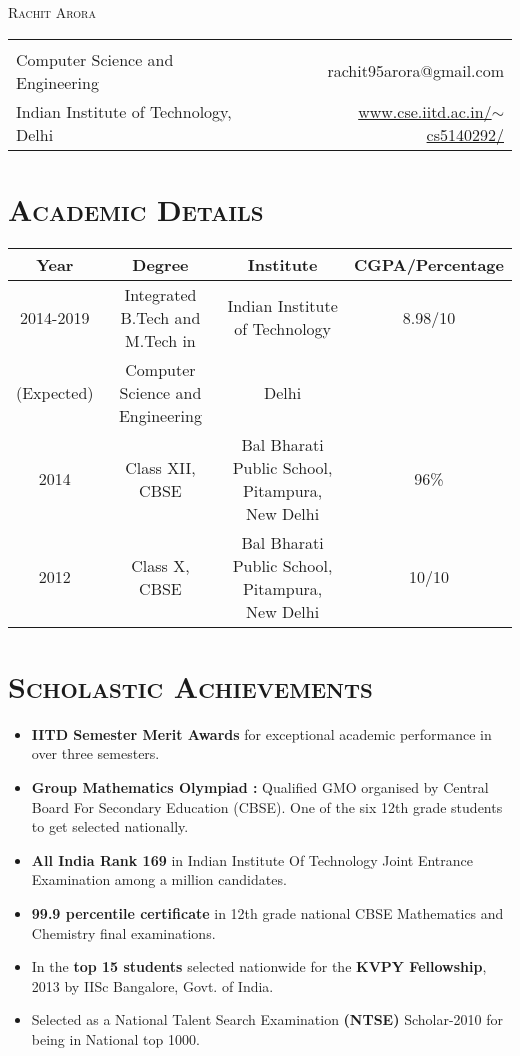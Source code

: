 \documentclass{article}
\newcommand{\tmpsection}[1]{}
\let\tmpsection=\section
\renewcommand{\section}[1]{\tmpsection*{\textsc{#1}}}
\begin{document}
\begin{center}
 {\large \textsc{Rachit Arora} }\\ 
\begin{tabular}{ l p{4cm} r }
    & &   \\
  Computer Science and Engineering & & rachit95arora@gmail.com\\
  Indian Institute of Technology, Delhi & & \href{http://www.cse.iitd.ac.in/~cs5140292/}{www.cse.iitd.ac.in/$\sim$cs5140292/} \\
\end{tabular}
\end{center}


\section{Academic Details}
\begin{center}
\begin{tabular}{ |c | c | c | c |}
\hline
Year & Degree & Institute & CGPA/Percentage \\ 
\hline
2014-2019 & Integrated B.Tech and M.Tech in & Indian Institute of Technology & 8.98/10 \\ 
(Expected) & Computer Science and Engineering & Delhi & \\ 
\hline
2014 & Class XII, CBSE & Bal Bharati Public School, Pitampura, New Delhi & 96\% \\ 
\hline
2012 & Class X, CBSE & Bal Bharati Public School, Pitampura, New Delhi & 10/10 \\  \hline
\end{tabular}
\end{center}

\section{Scholastic Achievements}
\begin{itemize}
    \setlength\itemsep{0em}
    \item \textbf{IITD Semester Merit Awards} for exceptional academic performance in over three semesters.
    \item \textbf{Group Mathematics Olympiad :}  Qualified GMO organised by Central Board For Secondary Education (CBSE). One of the six 12th grade students to get selected nationally.  
    \item \textbf{All India Rank 169} in Indian Institute Of Technology Joint Entrance Examination among a million candidates.
    \item \textbf{99.9 percentile certificate} in 12th grade national CBSE Mathematics and Chemistry final examinations.
    \item In the \textbf{top 15 students} selected nationwide for the \textbf{KVPY Fellowship}, 2013 by IISc Bangalore, Govt. of India.
    \item Selected as a National Talent Search Examination\textbf{ (NTSE)}  Scholar-2010 for being in National top 1000.
\end{itemize}
\end{document}

